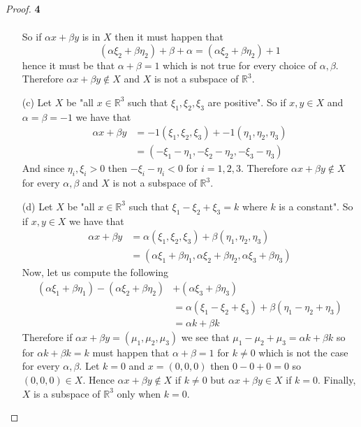 \documentclass[11pt]{article}
\newcommand{\R}{\mathbb{R}}
\theoremstyle{definition}
\begin{document}
\begin{proof}{\textbf{4}}
\begin{itemize}
\begin{align*}
        \end{align*}
        So if $\alpha x + \beta y$ is in $X$ then it must happen that
        $$(\alpha\xi_2 + \beta\eta_2) + \beta + \alpha = (\alpha\xi_2 + \beta\eta_2) + 1$$
        hence it must be that $\alpha + \beta = 1$ which is not true for every
        choice of $\alpha, \beta$. Therefore $\alpha x + \beta y \not\in X$ and
        $X$ is not a subspace of $\R^3$.
        \item [(c)] Let $X$ be "all $x \in \R^3$ such that $\xi_1, \xi_2, \xi_3$
        are positive".
        So if $x, y \in X$ and $\alpha = \beta = -1$ we have that
        \begin{align*}
        \alpha x + \beta y
            &= -1(\xi_1, \xi_2, \xi_3) + -1(\eta_1, \eta_2, \eta_3)\\
            &= (-\xi_1-\eta_1, -\xi_2-\eta_2, -\xi_3-\eta_3)
        \end{align*}
        And since $\eta_i, \xi_i > 0$ then $-\xi_i - \eta_i < 0$ for $i = 1,2,3$.
        Therefore $\alpha x + \beta y \not\in X$ for every $\alpha,\beta$ and
        $X$ is not a subspace of $\R^3$.
        \item [(d)] Let $X$ be "all $x \in \R^3$ such that
        $\xi_1 - \xi_2 + \xi_3 = k$ where $k$ is a constant".
        So if $x, y \in X$ we have that
        \begin{align*}
        \alpha x + \beta y
            &= \alpha(\xi_1, \xi_2, \xi_3) + \beta(\eta_1, \eta_2, \eta_3)\\
            &= (\alpha\xi_1 + \beta\eta_1, \alpha\xi_2+ \beta\eta_2,
            \alpha\xi_3 + \beta\eta_3)
        \end{align*}
        Now, let us compute the following
        \begin{align*}
            (\alpha\xi_1 + \beta\eta_1) -(\alpha\xi_2 + \beta\eta_2) &+
            (\alpha\xi_3 + \beta\eta_3)\\
            &= \alpha(\xi_1 -\xi_2 + \xi_3) + \beta(\eta_1 - \eta_2 + \eta_3)\\
            &= \alpha k + \beta k
        \end{align*}
        Therefore if $\alpha x + \beta y = (\mu_1, \mu_2, \mu_3)$ we see that
        $\mu_1 -\mu_2 + \mu_3 = \alpha k + \beta k$
        so for $\alpha k + \beta k = k$ must happen that $\alpha + \beta = 1$
        for $k \neq 0$ which is not the case for every $\alpha, \beta$.
        Let $k = 0$ and $x = (0,0,0)$ then $0 - 0 + 0 = 0$ so $(0,0,0) \in X$.
        Hence $\alpha x + \beta y \not\in X$ if $k \neq 0$ but
        $\alpha x + \beta y \in X$ if $k = 0$. Finally, $X$ is a subspace of
        $\R^3$ only when $k = 0$.
    \end{itemize}
\end{proof}
\end{document}
